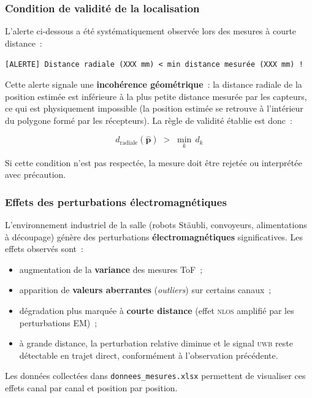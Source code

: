 \documentclass[12pt, a4paper]{article}
\newcommand{\UWB}{\textsc{uwb}}
\newcommand{\NLOS}{\textsc{nlos}}
\begin{document}
\subsubsection{Condition de validité de la localisation}

L'alerte ci-dessous a été systématiquement observée lors des mesures à courte
distance~:

\begin{center}
\texttt{[ALERTE] Distance radiale (XXX mm) < min distance mesurée (XXX mm) !}
\end{center}

Cette alerte signale une \textbf{incohérence géométrique}~: la distance radiale de
la position estimée est inférieure à la plus petite distance mesurée par les
capteurs, ce qui est physiquement impossible (la position estimée se retrouve
à l'intérieur du polygone formé par les récepteurs). La règle de validité
établie est donc~:

\[
  \boxed{\;d_{\text{radiale}}(\hat{\mathbf{p}}) \;>\; \min_k\, d_k\;}
\]

Si cette condition n'est pas respectée, la mesure doit être rejetée ou
interprétée avec précaution.

\subsubsection{Effets des perturbations électromagnétiques}

L'environnement industriel de la salle (robots Stäubli, convoyeurs, alimentations
à découpage) génère des perturbations \textbf{électromagnétiques} significatives.
Les effets observés sont~:

\begin{itemize}
  \item augmentation de la \textbf{variance} des mesures ToF~;
  \item apparition de \textbf{valeurs aberrantes} (\textit{outliers}) sur certains
        canaux~;
  \item dégradation plus marquée à \textbf{courte distance} (effet \NLOS{} amplifié
        par les perturbations EM)~;
  \item à grande distance, la perturbation relative diminue et le signal \UWB{}
        reste détectable en trajet direct, conformément à l'observation précédente.
\end{itemize}

Les données collectées dans \texttt{donnees\_mesures.xlsx} permettent de visualiser
ces effets canal par canal et position par position.
\end{document}
